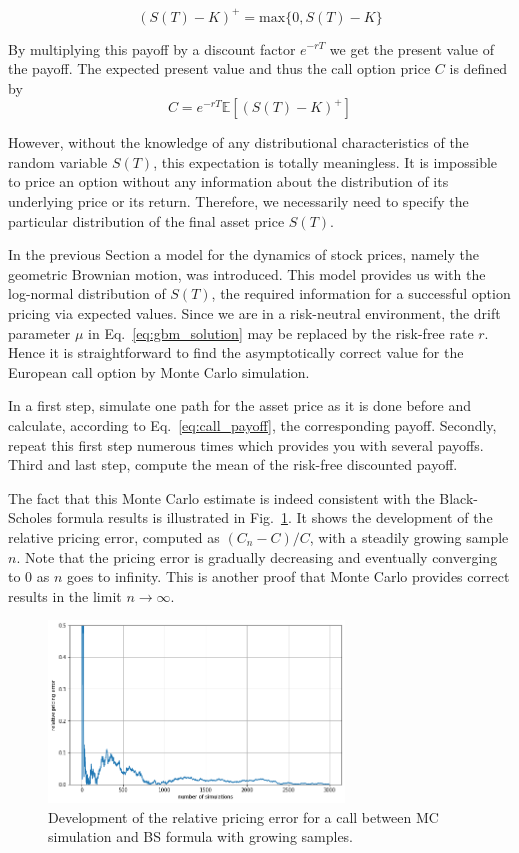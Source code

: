 \begin{equation}
(S(T)−K)^+ = \textrm{max}\{0,S(T)−K\}
\end{equation}

By multiplying this payoff by a discount factor $e^{−rT}$ we get 
the present value of the payoff. 
The expected present value and thus the call option price $C$ is defined 
by
\begin{equation} 
C = e^{−rT} \mathbb{E}[(S(T) −K)^+ ]
\label{eq:call_payoff}
\end{equation}

However, without the knowledge of any distributional
characteristics of the random variable $S(T)$, this expectation is totally
meaningless. It is impossible to price an option without any information
about the distribution of its underlying price or its return. Therefore,
we necessarily need to specify the particular distribution of the final
asset price $S(T)$. 

In the previous Section a model for the dynamics of
stock prices, namely the geometric Brownian motion, was introduced. This
model provides us with the log-normal distribution of $S(T)$, the required
information for a successful option pricing via expected values. Since
we are in a risk-neutral environment, the drift parameter $\mu$ in Eq.~\ref{eq:gbm_solution}
may be replaced by the risk-free rate $r$. Hence it is
straightforward to find the asymptotically correct value for the
European call option by Monte Carlo simulation. 

In a first step, simulate one path for the asset price as it is done 
before and calculate, according to Eq.~\ref{eq:call_payoff}, the corresponding payoff. 
Secondly, repeat this first step numerous times which provides you with several
payoffs. Third and last step, compute the mean of the risk-free 
discounted payoff. 

The fact that this Monte Carlo estimate is indeed consistent with the Black-Scholes formula results is illustrated 
in Fig.~\ref{fig:error_BS}. It shows the development of the relative pricing error, 
computed as $(C_n − C)/C$, with a steadily growing sample $n$.
Note that the pricing error is gradually
decreasing and eventually converging to 0 as $n$ goes to infinity. This is
another proof that Monte Carlo provides correct results in the limit $n\rightarrow\infty$.

\begin{figure}[htb]
	\centering
	\includegraphics[width=0.7\textwidth]{figures/call_pricing_error.png}
	\caption{Development of the relative pricing error for a call between MC simulation and BS formula with growing samples.}
	\label{fig:error_BS}
\end{figure}

